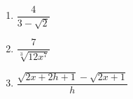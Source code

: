 \documentclass[10pt]{article}
\begin{document}
\begin{multicols}{3}
\begin{enumerate}
\setcounter{enumi}{\value{HW}}


\item   $\dfrac{4}{3 - \sqrt{2}}$  \label{rationalizefirst}

\item  $\dfrac{7}{\sqrt[3]{12x^7}}$

\item  $\dfrac{\sqrt{2x+2h+1} - \sqrt{2x+1}}{h}$ \label{rationalizelast}

\setcounter{HW}{\value{enumi}}
\end{enumerate}
\end{multicols}






\closegraphsfile
\end{document}
